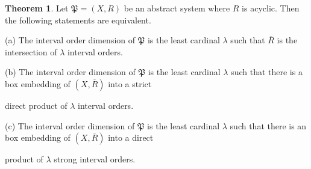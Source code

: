 \documentclass{article}
\theoremstyle{definition}
\newtheorem{theorem}{Theorem}[section]
\begin{document}
\begin{theorem}\label{than} Let $\mathfrak{P}=(X,R)$ be an abstract system where $R$ is acyclic. Then the following statements are equivalent.
\par\noindent
(a) The interval order dimension of $\mathfrak{P}$ is the least cardinal $\lambda$ such that $\overline{R}$ is the intersection of $\lambda$ interval orders.
\par\noindent
(b) The interval order dimension of $\mathfrak{P}$
is the least cardinal $\lambda$ such that there is a box embedding of $(X,\overline{R})$ into a strict 

\! \!\!direct product of $\lambda$ interval orders.
\par\noindent
(c) The interval order dimension of $\mathfrak{P}$
is the least cardinal $\lambda$ such that there is an box embedding of $(X,\overline{R})$ into a direct 

\! \!\!product of $\lambda$ strong interval orders.
\end{theorem}
\end{document}
